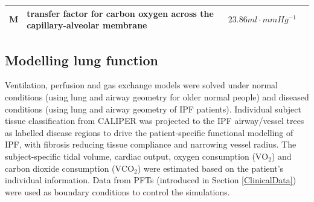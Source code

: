 \begin{table}[htbp]
\begin{tabular}{p{2.0cm} p{4.5cm} p{3.8cm} p{3.2cm}}
M & transfer factor for carbon oxygen across the capillary-alveolar membrane & $23.86 ml \cdot mmHg^{-1}$ & \cite{chakraborty2004diffusing} \\
\hline
\end{tabular}
\end{table}

\subsection{Modelling lung function}
Ventilation, perfusion and gas exchange models were solved under normal conditions (using lung and airway geometry for older normal people) and diseased conditions (using lung and airway geometry of IPF patients). Individual subject tissue classification from CALIPER was projected to the IPF airway/vessel trees as labelled disease regions to drive the patient-specific functional modelling of IPF, with fibrosis reducing tissue compliance and narrowing vessel radius. The subject-specific tidal volume, cardiac output, oxygen consumption ($\mathrm{VO_2}$) and carbon dioxide consumption ($\mathrm{VCO_2}$) were estimated based on the patient's individual information. Data from PFTs (introduced in Section \ref{ClinicalData}) were used as boundary conditions to control the simulations.

